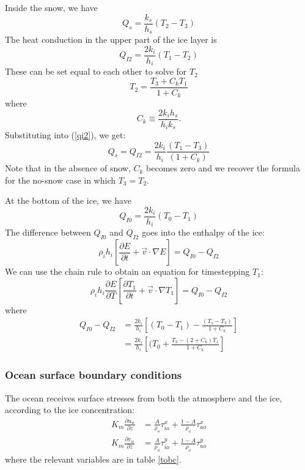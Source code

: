 Inside the snow, we have
\begin{equation}
   Q_s = \frac{k_s }{ h_s} (T_2 - T_3)
\end{equation}
The heat conduction in the upper part of the ice layer is
\begin{equation}
   Q_{I2} = \frac{ 2 k_i }{ h_i} (T_1 - T_2)
   \label{qi2}
\end{equation}
These can be set equal to each other to solve for $T_2$
\begin{equation}
   T_2 = \frac{T_3 + C_k T_1 }{ 1 + C_k}
\end{equation}
where
$$
  C_k \equiv \frac{2 k_i h_s }{ h_i k_s}.
$$
Substituting into (\ref{qi2}), we get:
\begin{equation}
  Q_s = Q_{I2} = \frac{2k_i }{ h_i} \frac{(T_1 - T_3) }{ (1 + C_k)}
\label{qsnow}
\end{equation}
Note that in the absence of snow, $C_k$ becomes zero and we recover the
formula for the no-snow case in which $T_3 = T_2$.

At the bottom of the ice, we have
\begin{equation}
  Q_{I0} = \frac{2 k_i }{ h_i} (T_0 - T_1)
\end{equation}
The difference between $Q_{I0}$ and $Q_{I2}$ goes into the enthalpy of
the ice:
\begin{equation}
   \rho_i h_i \left[ \frac{\partial E }{ \partial t} + \vec{v} \cdot 
   \nabla E \right] = Q_{I0} - Q_{I2}
\end{equation}
We can use the chain rule to obtain an equation for timestepping $T_1$:
\begin{equation}
   \rho_i h_i \frac{\partial E }{ \partial T}
   \left[ \frac{\partial T_1 }{ \partial t} + \vec{v} \cdot 
   \nabla T_1 \right] = Q_{I0} - Q_{I2}
\end{equation}
where
\begin{align*}
  Q_{I0} - Q_{I2} & = \frac{2 k_i }{ h_i} \left[ (T_0 - T_1) - 
  \frac{(T_1 - T_3) }{ 1 + C_k} \right] \\
	          & = \frac{2 k_i }{ h_i} \left[ (T_0 +
  \frac{T_3 - (2 + C_k) T_1 }{ 1 + C_k} \right]
\end{align*}

\subsubsection{Ocean surface boundary conditions}
The ocean receives surface stresses from both the atmosphere and the
ice, according to the ice concentration:
\begin{align}
   K_m \frac{\partial u_w }{ \partial z} & = \frac{A }{ \rho_o} \tau_{io}^x
    + \frac{1-A }{ \rho_o} \tau_{ao}^x \\
   K_m \frac{\partial v_w }{ \partial z} & = \frac{A }{ \rho_o} \tau_{io}^y
    + \frac{1-A }{ \rho_o} \tau_{ao}^y
\end{align}
where the relevant variables are in table \ref{tobc}.

